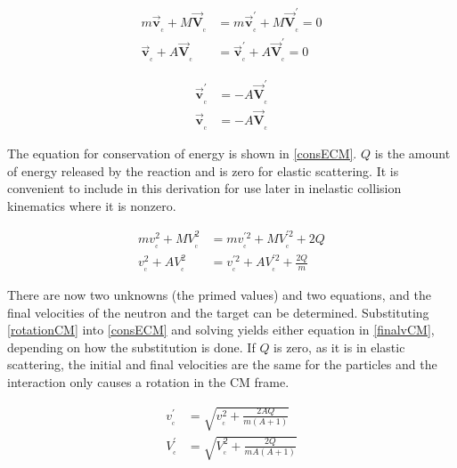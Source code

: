 \begin{equation}
\begin{split}
m \boldsymbol{\vec{v}_{_\mathrm{c}}} + M \boldsymbol{\vec{V}_{_\mathrm{c}}} &= m \boldsymbol{\vec{v}_{_\mathrm{c}}^\prime} + M \boldsymbol{\vec{V}_{_\mathrm{c}}^\prime} = 0\\
    \boldsymbol{\vec{v}_{_\mathrm{c}}} + A  \boldsymbol{\vec{V}_{_\mathrm{c}}} &=     \boldsymbol{\vec{v}_{_\mathrm{c}}^\prime} + A  \boldsymbol{\vec{V}_{_\mathrm{c}}^\prime} = 0
\end{split}
\label{consMomCM}
\end{equation}

\begin{equation}
\begin{split}
\boldsymbol{\vec{v}_{_\mathrm{c}}^\prime} &= - A  \boldsymbol{\vec{V}_{_\mathrm{c}}^\prime} \\
\boldsymbol{\vec{v}_{_\mathrm{c}}} &= -A  \boldsymbol{\vec{V}_{_\mathrm{c}}}
\end{split}
\label{rotationCM}
\end{equation}

The equation for conservation of energy is shown in \eqref{consECM}.  $Q$ is the amount of energy released by the reaction and is zero for elastic scattering.  It is convenient to include in this derivation for use later in inelastic collision kinematics where it is nonzero.

\begin{equation}
\begin{split}
m v_{_\mathrm{c}}^2 + M V_{_\mathrm{c}}^2 &= m v_{_\mathrm{c}}^{\prime2} + M V_{_\mathrm{c}}^{\prime2} + 2Q \\
    v_{_\mathrm{c}}^2 + A  V_{_\mathrm{c}}^2 &=     v_{_\mathrm{c}}^{\prime2} + A  V_{_\mathrm{c}}^{\prime2} + \frac{2Q}{m}
\end{split}
\label{consECM}
\end{equation}

There are now two unknowns (the primed values) and two equations, and the final velocities of the neutron and the target can be determined.  Substituting \eqref{rotationCM} into \eqref{consECM} and solving yields either equation in \eqref{finalvCM}, depending on how the substitution is done.  If $Q$ is zero, as it is in elastic scattering, the initial and final velocities are the same for the particles and the interaction only causes a rotation in the CM frame.

\begin{equation}
\begin{split}
v_{_\mathrm{c}}^{\prime} &=  \sqrt{ v_{_\mathrm{c}}^{2} + \frac{2AQ}{m(A+1)}  }  \\
V_{_\mathrm{c}}^{\prime} &= \sqrt{ V_{_\mathrm{c}}^{2} + \frac{2Q}{mA(A+1)}  } 
\end{split}
\label{finalvCM}
\end{equation}

